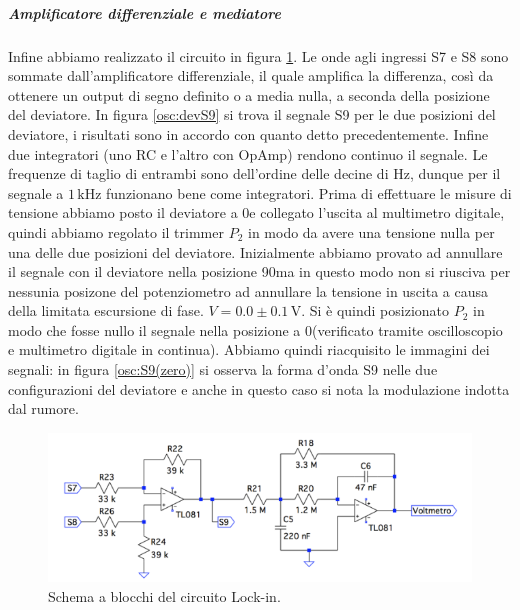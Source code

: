 \documentclass[10pt,a4paper]{article}
\begin{document}
\subparagraph{Amplificatore differenziale e mediatore}
Infine abbiamo realizzato il circuito in figura \ref{fig:amplificatorediff-mediatore}. Le onde agli ingressi S7 e S8 sono sommate dall'amplificatore differenziale, il quale amplifica la differenza, così da ottenere un output di segno definito o a media nulla, a seconda della posizione del deviatore. In figura \ref{osc:devS9} si trova il segnale S9 per le due posizioni del deviatore, i risultati sono in accordo con quanto detto precedentemente.
Infine due integratori (uno RC e l'altro con OpAmp) rendono continuo il segnale. Le frequenze di taglio di entrambi sono dell'ordine delle decine di Hz, dunque per il segnale a $1\,\mbox{kHz}$ funzionano bene come integratori.%
 Prima di effettuare le misure di tensione abbiamo posto il deviatore a 0\degree e collegato l'uscita al multimetro digitale, quindi abbiamo regolato il trimmer $P_2$ in modo da avere una tensione nulla per una delle due posizioni del deviatore. Inizialmente abbiamo provato ad annullare il segnale con il deviatore nella posizione 90\degree ma in questo modo non si riusciva per nessunia posizone del potenziometro ad annullare la tensione in uscita a causa della limitata escursione di fase. $V=0.0\pm0.1\,\mbox{V}$. Si è quindi posizionato $P_2$ in modo che fosse nullo il segnale nella posizione a 0\degree (verificato tramite oscilloscopio e multimetro digitale in continua). Abbiamo quindi riacquisito le immagini dei segnali: in figura \ref{osc:S9(zero)} si osserva la forma d'onda S9 nelle due configurazioni del deviatore e anche in questo caso si nota la modulazione indotta dal rumore.

\begin{figure}[!htb]
  \centering
  \includegraphics[scale=0.75]{amplificatorediff-mediatore.png}
\caption{Schema a blocchi del circuito Lock-in.\label{fig:amplificatorediff-mediatore}}
\end{figure}
\end{document}
